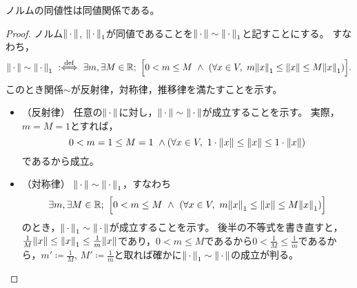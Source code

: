 \documentclass[b5paper,oneside,openany]{ltjsbook} %
\begin{document}
\begin{prop}
    ノルムの同値性は同値関係である。
    \begin{proof}
        ノルム$\norm{\dummy}$, $\norm{\dummy}_1$が同値であることを$\norm{\dummy}\sim\norm{\dummy}_1$と記すことにする。
        すなわち，
        \begin{equation}
            \norm{\dummy}\sim\norm{\dummy}_1\ \defarrow\ \exists m, \exists M\in\R;\ \bsqu{0<m\leq M\ \land \ \pare{
                \forall x\in V,\ m\norm{x}_1 \leq \norm{x} \leq M\norm{x}_1
            }}.
        \end{equation}
        このとき関係$\sim$が反射律，対称律，推移律を満たすことを示す。
        \begin{itemize}
            \item （反射律）
            任意の$\norm{\dummy}$に対し，$\norm{\dummy}\sim\norm{\dummy}$が成立することを示す。
            実際，$m=M=1$とすれば，
            \begin{equation}
                0<m=1\leq M=1\ \land \pare{\forall x\in V,\ 1\cdot \norm{x}\leq \norm{x}\leq 1\cdot \norm{x}}
            \end{equation}
            であるから成立。

            \item （対称律）
            $\norm{\dummy}\sim\norm{\dummy}_1$，すなわち
            \begin{equation}
                \exists m, \exists M\in\R;\ \bsqu{0<m\leq M\ \land \ \pare{
                \forall x\in V,\ m\norm{x}_1 \leq \norm{x} \leq M\norm{x}_1
                }}
            \end{equation}
            のとき，$\norm{\dummy}_1\sim\norm{\dummy}$が成立することを示す。
            後半の不等式を書き直すと，$\frac{1}{M}\norm{x}\leq \norm{x}_1\leq \frac{1}{m}\norm{x}$であり，$0<m\leq M$であるから$0<\frac{1}{M}\leq \frac{1}{m}$であるから，$m' \coloneqq \frac{1}{M}$, $M' \coloneqq  \frac{1}{m}$と取れば確かに$\norm{\dummy}_1\sim\norm{\dummy}$の成立が判る。


\end{itemize}
\end{proof}
\end{prop}
\end{document}
